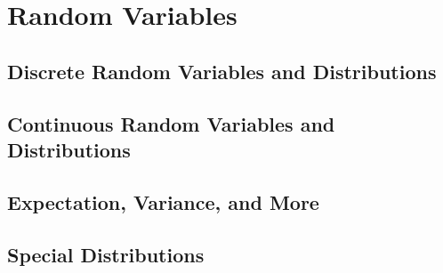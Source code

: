 \chapter{Random Variables} \label{ch:rv} 

\section{Discrete Random Variables and Distributions}


\section{Continuous Random Variables and Distributions}


\section{Expectation, Variance, and More}


\section{Special Distributions}

 
